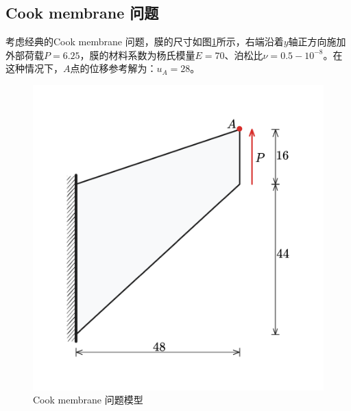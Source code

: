 \subsection{Cook membrane 问题}
考虑经典的Cook membrane 问题，膜的尺寸如图\ref{ch_4:fig:cook}所示，右端沿着$y$轴正方向施加外部荷载$P=6.25$，膜的材料系数为杨氏模量$E=70$、泊松比$\nu=0.5-10^{-8}$。在这种情况下，$A$点的位移参考解为：$u_A=28$。
\begin{figure}[!h]
    \centering 
        \includegraphics[scale=0.3]{figures/ch_4/cook.png}
        \caption{Cook membrane 问题模型}\label{ch_4:fig:cook}
\end{figure}

